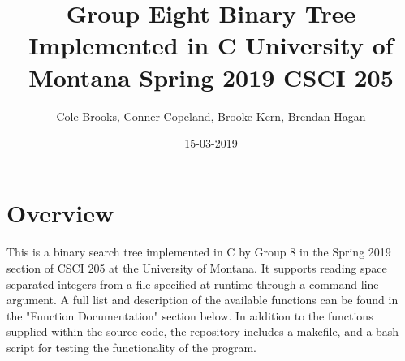 \documentclass{article}
\title{Group Eight Binary Tree Implemented in C University of Montana Spring 2019 CSCI 205}
\date{15-03-2019}
\author{Cole Brooks, Conner Copeland, Brooke Kern, Brendan Hagan}
\begin{document}
\maketitle
{}
\newpage
{}

\section{Overview}
\paragraph{}
This is a binary search tree implemented in C by Group 8 in the Spring 2019 section of CSCI 205 at the University of Montana. It supports reading space separated integers from a file specified at runtime through a command line argument. A full list and description of the available functions can be found in the "Function Documentation" section below. In addition to the functions supplied within the source code, the repository includes a makefile, and a bash script for testing the functionality of the program.
\end{document}

